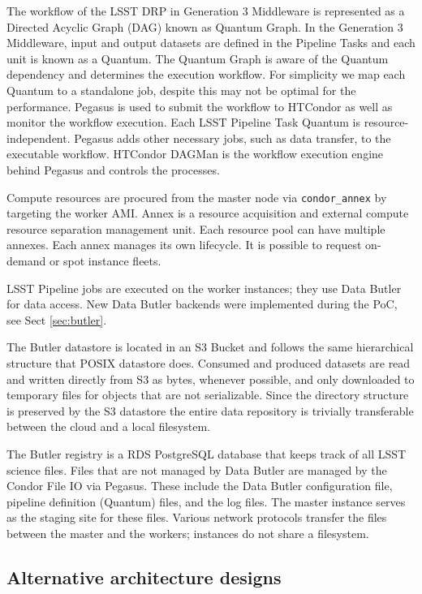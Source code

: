 The workflow of the LSST DRP in Generation 3 Middleware is represented as a Directed Acyclic Graph (DAG) known as Quantum Graph.
In the Generation 3 Middleware, input and output datasets are defined in the Pipeline Tasks and each unit is known as a Quantum.
The Quantum Graph is aware of the Quantum dependency and determines the execution workflow.
For simplicity we map each Quantum to a standalone job, despite this may not be optimal for the performance.
Pegasus is used to submit the workflow to HTCondor as well as monitor the workflow execution.
Each LSST Pipeline Task Quantum is resource-independent. Pegasus adds other necessary jobs, such as data transfer, to the executable workflow. HTCondor DAGMan is the workflow execution engine behind Pegasus and controls the processes.

Compute resources are procured from the master node via \texttt{condor\_annex} by targeting the worker AMI. Annex is a resource acquisition and external compute resource separation management unit. Each resource pool can have multiple annexes. Each annex manages its own lifecycle. It is possible to request on-demand or spot instance fleets.

LSST Pipeline jobs are executed on the worker instances; they use Data Butler for data access.
New Data Butler backends were implemented during the PoC, see Sect \ref{sec:butler}.

The Butler datastore is located in an S3 Bucket and follows the same hierarchical structure that POSIX datastore does. Consumed and produced datasets are read and written directly from S3 as bytes, whenever possible, and only downloaded to temporary files for objects that are not serializable.
Since the directory structure is preserved by the S3 datastore the entire data repository is trivially transferable between the cloud and a local filesystem.

The Butler registry is a RDS PostgreSQL database that keeps track of all LSST science files.
Files that are not managed by Data Butler are managed by the Condor File IO via Pegasus. These include the Data Butler configuration file, pipeline definition (Quantum) files, and the log files. The master instance serves as the staging site for these files. Various network protocols transfer the files between the master and the workers; instances do not share a filesystem.

\subsection{Alternative architecture designs}

